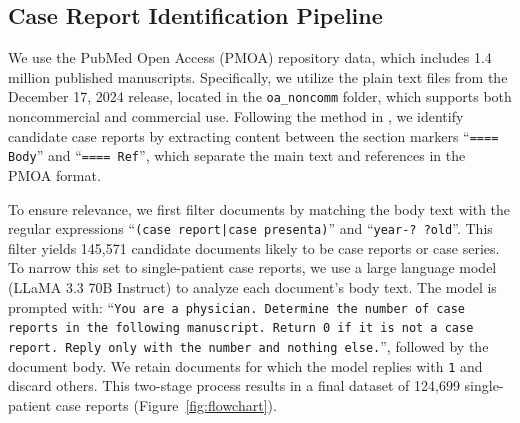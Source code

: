 

\subsection{Case Report Identification Pipeline}

We use the PubMed Open Access (PMOA) repository data, which includes 1.4 million published manuscripts. Specifically, we utilize the plain text files from the December 17, 2024 release, located in the \texttt{oa\_noncomm} folder, which supports both noncommercial and commercial use. Following the method in \cite{wang2025large}, we identify candidate case reports by extracting content between the section markers ``\texttt{==== Body}'' and ``\texttt{==== Ref}'', which separate the main text and references in the PMOA format.

To ensure relevance, we first filter documents by matching the body text with the regular expressions ``\texttt{(case report|case presenta)}'' and ``\texttt{year-? ?old}''. This filter yields 145,571 candidate documents likely to be case reports or case series. To narrow this set to single-patient case reports, we use a large language model (LLaMA 3.3 70B Instruct) to analyze each document's body text. The model is prompted with: ``\texttt{You are a physician. Determine the number of case reports in the following manuscript. Return 0 if it is not a case report. Reply only with the number and nothing else.}'', followed by the document body. We retain documents for which the model replies with \texttt{1} and discard others. This two-stage process results in a final dataset of 124,699 single-patient case reports (Figure~\ref{fig:flowchart}).

